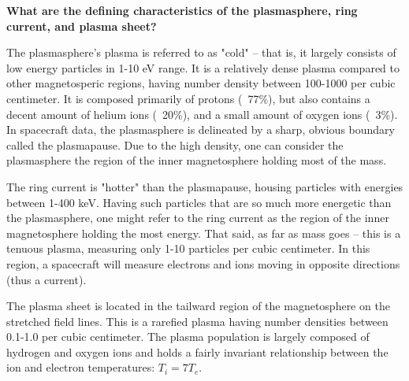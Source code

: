 \textbf{ What are the defining characteristics of the plasmasphere, ring
current, and plasma sheet?}

The plasmasphere's plasma is referred to as "cold" -- that is, it
largely consists of low energy particles in 1-10 eV range. It is a
relatively dense plasma compared to other magnetosperic regions, having
number density between 100-1000 per cubic centimeter. It is composed
primarily of protons (~77\%), but also contains a decent amount of
helium ions (~20\%), and a small amount of oxygen ions (~3\%). In
spacecraft data, the plasmasphere is delineated by a sharp, obvious
boundary called the plasmapause. Due to the high density, one can
consider the plasmasphere the region of the inner magnetosphere
holding most of the mass.

The ring current is "hotter" than the plasmapause, housing particles
with energies between 1-400 keV. Having such particles that are so much
more energetic than the plasmasphere, one might refer to the ring
current as the region of the inner magnetosphere holding the most
energy. That said, as far as mass goes -- this is a tenuous plasma,
measuring only 1-10 particles per cubic centimeter. In this region, a
spacecraft will measure electrons and ions moving in opposite directions
(thus a current). 

The plasma sheet is located in the tailward region of the magnetosphere
on the stretched field lines. This is a rarefied plasma having number
densities between 0.1-1.0 per cubic centimeter. The plasma population is
largely composed of hydrogen and oxygen ions and holds a fairly
invariant relationship between the ion and electron temperatures: $T_{i}
= 7T_{e}$.


